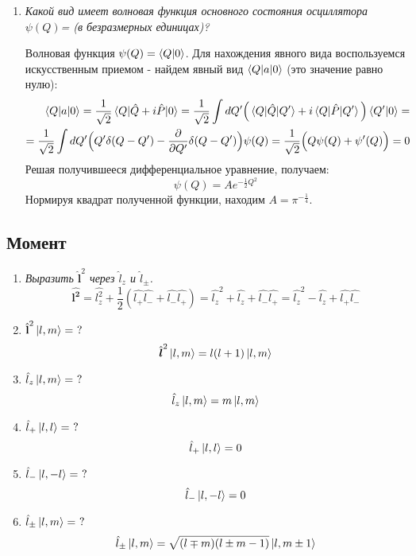 \documentclass{article}
\begin{document}
\begin{enumerate}
	\item \textit{Какой вид имеет волновая функция основного состояния осциллятора $\psi(Q)$= (в безразмерных единицах)?}
	
	Волновая функция $\psi(Q) = \braket{Q|0}$. Для нахождения явного вида воспользуемся искусственным приемом - найдем явный вид $\braket{Q|a|0}$ (это значение равно нулю):
	\begin{equation}
	\begin{split}
		\braket{Q|a|0} = \frac{1}{\sqrt{2}}\braket{Q|\hat{Q} + i \hat{P}|0} = \frac{1}{\sqrt{2}}\int dQ' \Big( \braket{Q|\hat{Q}|Q'} + i\braket{Q|\hat{P}|Q'} \Big)\braket{Q'|0} = \\ =\frac{1}{\sqrt{2}}\int dQ'\Big(Q'\delta(Q-Q') - \frac{\partial}{\partial Q'}\delta(Q-Q') \Big) \psi(Q) = \frac{1}{\sqrt{2}} \Big(Q\psi(Q) + \psi'(Q)\Big) = 0
	\end{split}
	\end{equation}	
	Решая получившееся дифференциальное уравнение, получаем:
	\begin{equation}
		\psi(Q) = A e^{-\frac{1}{2}Q^2}
	\end{equation}
	Нормируя квадрат полученной функции, находим $A = \pi^{-\frac{1}{4}}$.
\end{enumerate}


\subsection*{Момент}
	\begin{enumerate}
		\item \textit{Выразить $\hat{\textbf{l}}^2$ через $\hat{l}_z$ и $\hat{l}_\pm$.}	
		\begin{equation}
			\hat{\boldsymbol{l^{2}}}=\hat{l_{z}^{2}}+\frac{1}{2}(\hat{l_{+}}\hat{l_{-}}+\hat{l_{-}}\hat{l_{+}})=\hat{l_{z}}^{2}+\hat{l_{z}}+\hat{l_{-}}\hat{l_{+}}=\hat{l_{z}}^{2}-\hat{l_{z}}+\hat{l_{+}}\hat{l_{-}}
		\end{equation}
		\item \textit{$\hat{\textbf{l}}^2 \ket{l, m} = \ ?$}
		\begin{equation}
			\hat{\boldsymbol{l}}^2\ket{l,m}=l(l+1)\ket{l,m}
		\end{equation}			
		\item \textit{$\hat{l}_z \ket{l, m} = \ ?$}
		\begin{equation}
			\hat{l}_z\ket{l,m}=m\ket{l,m}
		\end{equation}	
		\item \textit{$\hat{l}_+ \ket{l, l} = \ ?$}
		\begin{equation}
			\hat{l}_+\ket{l,l}=0
		\end{equation}	
		\item \textit{$\hat{l}_- \ket{l, -l} = \ ?$}
		\begin{equation}
			\hat{l}_-\ket{l,-l}=0
		\end{equation}		
		\item \textit{$\hat{l}_\pm \ket{l, m} = \ ?$}
		\begin{equation}
			\hat{l}_\pm\ket{l,m}=\sqrt{(l\mp m)(l\pm m-1)}\ket{l,m\pm1}
		\end{equation}	
	\end{enumerate}
	
\end{document}
